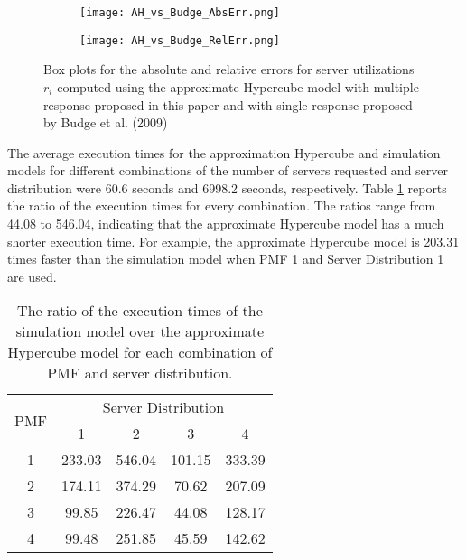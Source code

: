 \documentclass[11pt]{article}\topmargin 0mm
\begin{document}
\begin{figure}
        \centering
        \begin{subfigure}[b]{0.49\textwidth}
                \texttt{[image: AH\_vs\_Budge\_AbsErr.png]}
                \label{fig:rel_err1}
        \end{subfigure}
        \begin{subfigure}[b]{0.49\textwidth}
                \texttt{[image: AH\_vs\_Budge\_RelErr.png]}
                \label{fig:rel_err2}
        \end{subfigure}
        \caption{Box plots for the absolute and relative errors for server utilizations $r_i$ computed using the approximate Hypercube model with multiple response proposed in this paper and with single response proposed by Budge et al. (2009)}\label{fig:vs_budge}
\end{figure}

{The average execution times for the approximation Hypercube
and simulation models for different combinations of the number
of servers requested and server distribution were 60.6 seconds
and 6998.2 seconds, respectively. Table \ref{tbl:exec_times}
reports the ratio of the execution times for every combination.
The ratios range from 44.08 to 546.04, indicating that the
approximate Hypercube model has a much shorter execution time.
For example, the approximate Hypercube model is 203.31 times
faster than the simulation model when PMF 1 and Server
Distribution 1 are used. }

\begin{table}
\footnotesize \centering \caption{The ratio of the execution times of the simulation model over the approximate Hypercube model for each combination of PMF and server distribution.
\label{tbl:exec_times}} {\begin{tabular}{c c c c c} \hline
 \multirow{2}{0.3in}{PMF} & \multicolumn{4}{c}{Server Distribution} \\
 & 1 & 2 & 3 & 4 \\
\hline
1 & 233.03 & 546.04 & 101.15 & 333.39 \\
2 & 174.11 & 374.29 &  70.62 & 207.09 \\
3 &  99.85 & 226.47 &  44.08 & 128.17 \\
4 &  99.48 & 251.85 &  45.59 & 142.62 \\
\hline
\end{tabular}}
\end{table}
\end{document}
